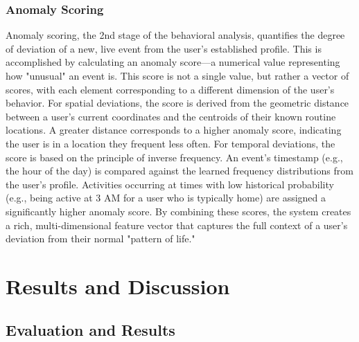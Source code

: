 \documentclass[12pt,a4paper,oneside,english]{book}
\begin{document}
{\subsection{Anomaly Scoring }
Anomaly scoring, the 2nd stage of the behavioral analysis, quantifies the degree of deviation of a new, live event from the user's established profile. This is accomplished by calculating an anomaly score—a numerical
 value representing how "unusual" an event is. This score is not a single value, but rather a vector of scores, with each element corresponding to a different dimension of the user's behavior.
For spatial deviations, the score is derived from the geometric distance between a user's current coordinates and the centroids of their known routine locations. A greater distance corresponds to a 
higher anomaly score, indicating the user is in a location they frequent less often.
For temporal deviations, the score is based on the principle of inverse frequency. 
An event's timestamp (e.g., the hour of the day) is compared against the learned frequency distributions from the user's profile. Activities occurring at times with low historical probability 
(e.g., being active at 3 AM for a user who is typically home) are assigned a significantly higher anomaly score. By combining these scores, the system creates a rich, multi-dimensional feature vector that 
captures the full context of a user's deviation from their normal "pattern of life."


\chapter{Results and Discussion}
\label{ch:results_and_disc}

\section{Evaluation and Results}
\label{sec:res}
}
\end{document}
